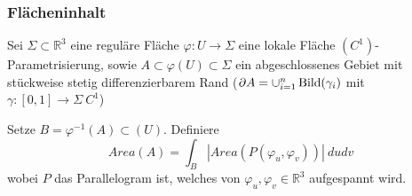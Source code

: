 \documentclass[../main.tex]{subfiles}
\begin{document}
\subsubsection*{Flächeninhalt}
Sei $\Sigma \subset \mathbb{R}^3$ eine reguläre Fläche $\varphi : U \to \Sigma$ eine lokale
Fläche $(C^1)$-Parametrisierung, sowie $A\subset \varphi (U) \subset \Sigma$ ein abgeschlossenes Gebiet
mit stückweise stetig differenzierbarem Rand ($\partial A=\cup  _{i=1}^n \operatorname{Bild}(\gamma _i)$ mit $\gamma : [0,1] \to \Sigma \ C^1$)


Setze $B = \varphi ^{-1}(A) \subset (U)$. Definiere
$$Area(A)=\int _B |Area(P(\varphi_u,\varphi_v))| \ dudv$$
wobei $P$ das Parallelogram ist, welches von $\varphi_u, \varphi_v \in \mathbb{R}^3$
aufgespannt wird.

\end{document}
